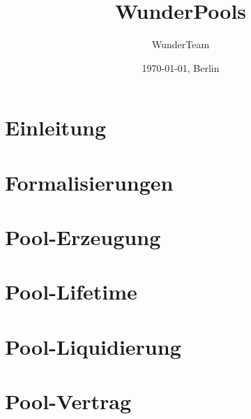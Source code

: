\documentclass[11pt]{scrartcl}
\title{WunderPools}
\author{WunderTeam}
\date{\today{}, Berlin}
\begin{document}
\maketitle
\tableofcontents{}

\newpage



\section{Einleitung}
\label{sec:pools-einleitung}
\vspace{0.3cm}


\section{Formalisierungen}
\vspace{0.3cm}


\section{Pool-Erzeugung}
\vspace{0.3cm}


\section{Pool-Lifetime}
\vspace{0.3cm}


\section{Pool-Liquidierung}
\label{sec:pools-liquidierung}
\vspace{0.3cm}


\section{Pool-Vertrag}
\label{sec:pools-vertrag}
\vspace{0.3cm}
\end{document}
